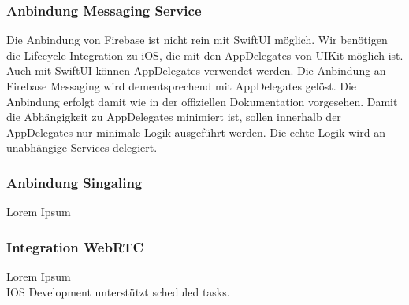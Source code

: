 \subsubsection{Anbindung Messaging Service}

Die Anbindung von Firebase ist nicht rein mit SwiftUI möglich.
Wir benötigen die Lifecycle Integration zu iOS, die mit den AppDelegates von UIKit möglich ist.
Auch mit SwiftUI können AppDelegates verwendet werden.
Die Anbindung an Firebase Messaging wird dementsprechend mit AppDelegates gelöst.
Die Anbindung erfolgt damit wie in der offiziellen Dokumentation vorgesehen.
Damit die Abhängigkeit zu AppDelegates minimiert ist, sollen innerhalb der AppDelegates nur minimale Logik ausgeführt werden.
Die echte Logik wird an unabhängige Services delegiert.


\subsubsection{Anbindung Singaling}

Lorem Ipsum\\

\subsubsection{Integration WebRTC}

Lorem Ipsum\\


IOS Development unterstützt scheduled tasks.

\clearpage
